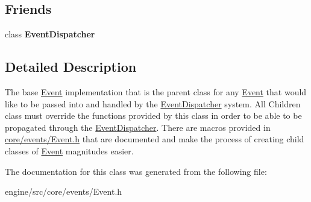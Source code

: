 \subsection*{Friends}
\begin{DoxyCompactItemize}
\item 
\mbox{\label{classengine_1_1events_1_1Event_aad5f38ccd490ea17008460423f52325a}} 
class {\bfseries Event\+Dispatcher}
\end{DoxyCompactItemize}


\subsection{Detailed Description}
The base \hyperlink{classengine_1_1events_1_1Event}{Event} implementation that is the parent class for any \hyperlink{classengine_1_1events_1_1Event}{Event} that would like to be passed into and handled by the \hyperlink{classengine_1_1events_1_1EventDispatcher}{Event\+Dispatcher} system. All Children class must override the functions provided by this class in order to be able to be propagated through the \hyperlink{classengine_1_1events_1_1EventDispatcher}{Event\+Dispatcher}. There are macros provided in {\ttfamily \hyperlink{Event_8h_source}{core/events/\+Event.\+h}} that are documented and make the process of creating child classes of \hyperlink{classengine_1_1events_1_1Event}{Event} magnitudes easier. 

The documentation for this class was generated from the following file\+:\begin{DoxyCompactItemize}
\item 
engine/src/core/events/Event.\+h\end{DoxyCompactItemize}
